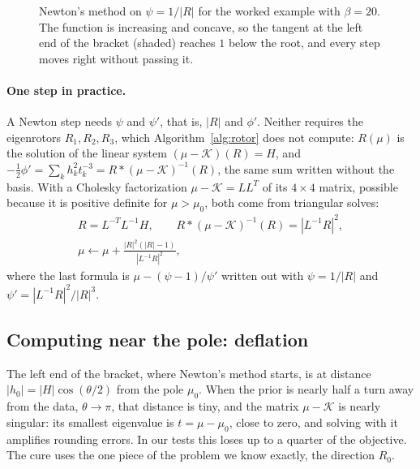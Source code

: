 \documentclass{birkjour}
\theoremstyle{definition}
\theoremstyle{remark}
\numberwithin{equation}{section}
\newcommand{\K}{\mathcal{K}}
\begin{document}
\begin{figure}[t]
\centering
{}
\caption{Newton's method on $\psi = 1/|R|$ for the worked example with $\beta = 20$. The function is increasing and concave, so the tangent at the left end of the bracket (shaded) reaches $1$ below the root, and every step moves right without passing it.}
\label{fig:prior_newton}
\end{figure}

\paragraph{One step in practice.} A Newton step needs $\psi$ and $\psi'$, that is, $|R|$ and $\phi'$. Neither requires the eigenrotors $R_1, R_2, R_3$, which Algorithm~\ref{alg:rotor} does not compute: $R(\mu)$ is the solution of the linear system $(\mu - \K)(R) = H$, and $-\frac12 \phi' = \sum_k h_k^2 t_k^{-3} = R * (\mu - \K)^{-1}(R)$, the same sum written without the basis. With a Cholesky factorization $\mu - \K = L L^T$ of its $4 \times 4$ matrix, possible because it is positive definite for $\mu > \mu_0$, both come from triangular solves:
\begin{equation}
\label{eqn:prior_step}
\begin{gathered}
R = L^{-T} L^{-1} H, \qquad R * (\mu - \K)^{-1}(R) = |L^{-1} R|^2, \\
\mu \leftarrow \mu + \frac{|R|^2 (|R| - 1)}{|L^{-1} R|^2},
\end{gathered}
\end{equation}
where the last formula is $\mu - (\psi - 1)/\psi'$ written out with $\psi = 1/|R|$ and $\psi' = |L^{-1} R|^2 / |R|^3$.

\subsection{Computing near the pole: deflation}

The left end of the bracket, where Newton's method starts, is at distance $|h_0| = |H| \cos(\theta/2)$ from the pole $\mu_0$. When the prior is nearly half a turn away from the data, $\theta \to \pi$, that distance is tiny, and the matrix $\mu - \K$ is nearly singular: its smallest eigenvalue is $t = \mu - \mu_0$, close to zero, and solving with it amplifies rounding errors. In our tests this loses up to a quarter of the objective. The cure uses the one piece of the problem we know exactly, the direction $R_0$.
\end{document}
